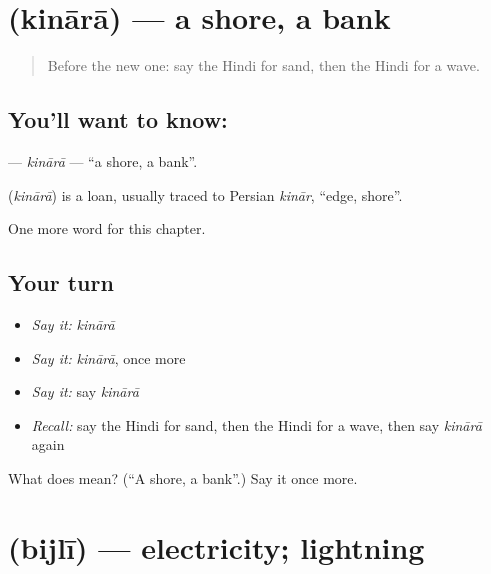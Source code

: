 \section[\texorpdfstring{\hi{किनारा} (kinārā)}{किनारा (kinārā)}]{ (kinārā) — a shore, a bank}

\label{lesson:HI-C144-kinara}



\begin{quote}
Before the new one: say the Hindi for sand, then the Hindi for a wave.
\end{quote}

\subsection*{You'll want to know: }
\textbf{} — \emph{kinārā} — \textquotedblleft{}a shore, a bank\textquotedblright{}.

\begin{cousinweb}
\textbf{} (\emph{kinārā}) is a loan, usually traced to Persian \emph{kinār}, \textquotedblleft{}edge, shore\textquotedblright{}.
\end{cousinweb}

\begin{grammarlens}[title={What you've built}]
One more word for this chapter.
\end{grammarlens}

\subsection*{Your turn}
\begin{itemize}
\raggedright
  \item \emph{Say it:} \emph{kinārā}
  \item \emph{Say it:} \emph{kinārā}, once more
  \item \emph{Say it:} say \emph{kinārā}
  \item \emph{Recall:} say the Hindi for sand, then the Hindi for a wave, then say \emph{kinārā} again
\end{itemize}

\begin{tcolorbox}[breakable,colback=teal!4,colframe=teal!35!black,title={Before you move on}]
What does  mean? (\textquotedblleft{}A shore, a bank\textquotedblright{}.) Say it once more.
\end{tcolorbox}
\section[\texorpdfstring{\hi{बिजली} (bijlī)}{बिजली (bijlī)}]{ (bijlī) — electricity; lightning}

